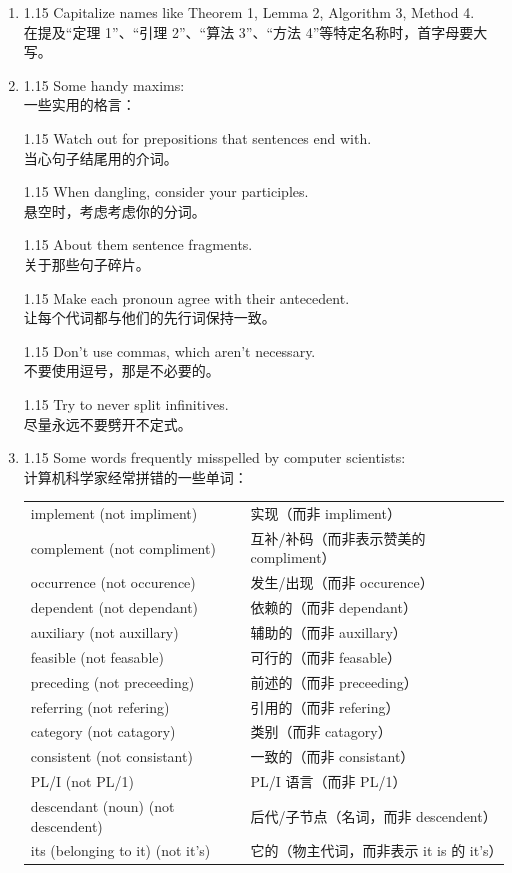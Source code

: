 \documentclass[12pt,a4paper]{article}
\newcommand{\bilingual}[2]{
    \begin{spacing}{1.15} %
        \noindent \normalsize #1 \\[-0.5ex] %
        \small \textcolor{blue!70!black}{#2} %
    \end{spacing}
    \vspace{0.8em} %
}
\begin{document}
\begin{enumerate}
\item \bilingual{Capitalize names like Theorem 1, Lemma 2, Algorithm 3, Method 4.}{在提及“定理 1”、“引理 2”、“算法 3”、“方法 4”等特定名称时，首字母要大写。} %

\item \bilingual{Some handy maxims:}{一些实用的格言：} %
\bilingual{Watch out for prepositions that sentences end with.}{当心句子结尾用的介词。} %
\bilingual{When dangling, consider your participles.}{悬空时，考虑考虑你的分词。} %
\bilingual{About them sentence fragments.}{关于那些句子碎片。} %
\bilingual{Make each pronoun agree with their antecedent.}{让每个代词都与他们的先行词保持一致。} %
\bilingual{Don't use commas, which aren't necessary.}{不要使用逗号，那是不必要的。} %
\bilingual{Try to never split infinitives.}{尽量永远不要劈开不定式。} %

\item \bilingual{Some words frequently misspelled by computer scientists:}{计算机科学家经常拼错的一些单词：} %

\begin{center}
\renewcommand{\arraystretch}{1.2} %
\begin{tabular}{ll}
    implement (not impliment) & \small\textcolor{blue!70!black}{实现（而非 impliment）} \\
    complement (not compliment) & \small\textcolor{blue!70!black}{互补/补码（而非表示赞美的 compliment）} \\
    occurrence (not occurence) & \small\textcolor{blue!70!black}{发生/出现（而非 occurence）} \\
    dependent (not dependant) & \small\textcolor{blue!70!black}{依赖的（而非 dependant）} \\
    auxiliary (not auxillary) & \small\textcolor{blue!70!black}{辅助的（而非 auxillary）} \\
    feasible (not feasable) & \small\textcolor{blue!70!black}{可行的（而非 feasable）} \\
    preceding (not preceeding) & \small\textcolor{blue!70!black}{前述的（而非 preceeding）} \\
    referring (not refering) & \small\textcolor{blue!70!black}{引用的（而非 refering）} \\
    category (not catagory) & \small\textcolor{blue!70!black}{类别（而非 catagory）} \\
    consistent (not consistant) & \small\textcolor{blue!70!black}{一致的（而非 consistant）} \\
    PL/I (not PL/1) & \small\textcolor{blue!70!black}{PL/I 语言（而非 PL/1）} \\
    descendant (noun) (not descendent) & \small\textcolor{blue!70!black}{后代/子节点（名词，而非 descendent）} \\
    its (belonging to it) (not it's) & \small\textcolor{blue!70!black}{它的（物主代词，而非表示 it is 的 it's）} \\
\end{tabular}
\end{center}


\end{enumerate}
\end{document}
